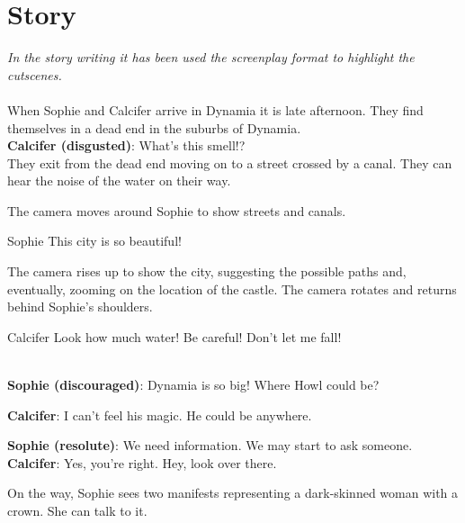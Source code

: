 \section{Story}

\noindent \textit{In the story writing it has been used the screenplay format to highlight the cutscenes.}\\\\

\noindent When Sophie and Calcifer arrive in Dynamia it is late afternoon. They find themselves in a dead end in the suburbs of Dynamia.\\

\textbf{Calcifer (disgusted)}: What’s this smell!?\\

\noindent They exit from the dead end moving on to a street crossed by a canal. They can hear the noise of the water on their way.

\begin{screenplay}

The camera  moves around Sophie to show streets and canals. 

\begin{dialogue}[amazed]{Sophie}
This city is so beautiful!
\end{dialogue}

The camera rises up to show the city, suggesting the possible paths and, eventually,  zooming on the location of the castle. The camera rotates and returns behind Sophie's shoulders. 

\begin{dialogue}[worried]{Calcifer}
Look how much water! Be careful! Don’t let me fall!
\end{dialogue}
\end{screenplay}

\noindent \\

\textbf{Sophie (discouraged)}: Dynamia is so big! Where Howl could be?

\textbf{Calcifer}: I can’t feel his magic. He could be anywhere.

\textbf{Sophie (resolute)}: We need information. We may start to ask someone.\\

\textbf{Calcifer}: Yes, you're right. Hey, look over there.

\noindent On the way, Sophie sees two manifests representing a dark-skinned woman with a crown. She can talk to it.\\

